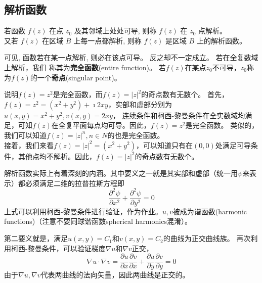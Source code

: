 \subsection{解析函数}
\begin{Definition}
若函数 $f(z)$ 在点 $z_0$ 及其邻域上处处可导, 则称 $f(z)$ 在 $z_0$ 点解析。\\
 又若 $f(z)$ 在区域 $B$ 上每一点都解析, 则称 $f(z)$ 是区域 $B$ 上的解析函数。
\end{Definition} 
 可见, 函数若在某一点解析, 则必在该点可导。 反之却不一定成立。 若在全复数域上解析，我们
 称其为{\bf 完全函数}(entire function)。
 若$f(z)$在某点$z_0$不可导，$z_0$称为$f(z)$的一个{\bf 奇点}(singular point)。
 \begin{examplebox}{说明$f(z)=z^2$是完全函数，而$f(z)=|z|^2$的奇点数有无数个。}
    首先，$f(z) =z^2 = (x^2 + y ^2) + \imath 2 x y$，实部和虚部分别为$u(x,y) = x^2+ y^2, v(x,y)=2x y$，
连续条件和柯西-黎曼条件在全实数域均满足，可知$f(z)$在全复平面每点均可导。因此，$f(z)=z^2$是完全函数。
类似的，我们可以知道$f(z)=|z|^n, n\in N$的也是完全函数。\\
    接着，我们来看$f(z) = |z|^2 = (x^2 + y ^2)$，可以知道只有在$(0,0)$处满足可导条件，其他点均不解析。因此，$f(z)=|z|^2$的奇点数有无数个。
 \end{examplebox}

 解析函数实际上有着深刻的内涵。其中要义之一就是其实部和虚部（统一用$\psi$来表示）都必须满足二维的拉普拉斯方程即
 \begin{equation}
    \label{eq:Laplace_eq}
    \frac{\partial^2 \psi}{\partial x^2}+\frac{\partial^2 \psi}{\partial y^2}=0
 \end{equation}
上式可以利用柯西-黎曼条件进行验证，作为作业。$u,v$被成为谐函数(harmonic functions)（注意不要同球谐函数spherical harmonics混淆）。

第二要义就是，满足$u(x,y) = C_1$和$v(x,y)= C_2$的曲线为正交曲线族。
再次利用柯西-黎曼条件，可以验证梯度$\nabla u $和$\nabla v$正交，
\begin{equation}
    \nabla u \cdot \nabla v = \frac{\partial u}{\partial x} \frac{\partial v}{\partial x}+\frac{\partial u}{\partial y} \frac{\partial v}{\partial y}=0
\end{equation}
由于$\nabla u, \nabla v$代表两曲线的法向矢量，因此两曲线是正交的。

